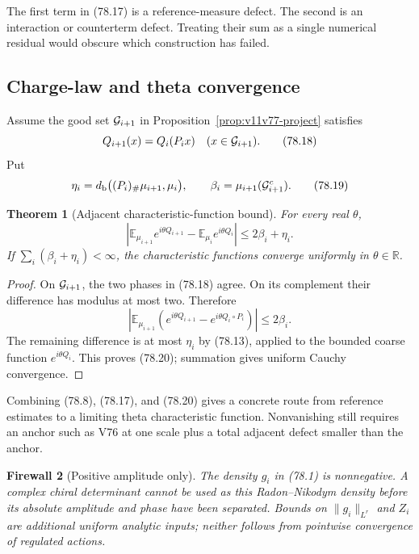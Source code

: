 \documentclass[11pt]{article}
\newtheorem{theorem}{Theorem}[section]
\newtheorem{firewall}[theorem]{Firewall}
\begin{document}
The first term in (78.17) is a reference-measure defect.  The second
is an interaction or counterterm defect.  Treating their sum as a
single numerical residual would obscure which construction has
failed.

\subsection{Charge-law and theta convergence}

Assume the good set \({\cal G}_{i+1}\) in
Proposition~\ref{prop:v11v77-project} satisfies
\[
              Q_{i+1}(x)=Q_i(P_ix)
                        \quad(x\in{\cal G}_{i+1}).            \tag{78.18}
\]
Put
\[
 \eta_i=d_{\rm b}\big((P_i)_\#\mu_{i+1},\mu_i\big),\qquad
 \beta_i=\mu_{i+1}({\cal G}_{i+1}^c).                         \tag{78.19}
\]

\begin{theorem}[Adjacent characteristic-function bound]
\label{thm:v11v78-characteristic}
For every real \(\theta\),
\[
 \left|
 \mathbb E_{\mu_{i+1}}e^{i\theta Q_{i+1}}
 -\mathbb E_{\mu_i}e^{i\theta Q_i}
 \right|
 \le 2\beta_i+\eta_i.                                        \tag{78.20}
\]
If \(\sum_i(\beta_i+\eta_i)<\infty\), the characteristic functions
converge uniformly in \(\theta\in\mathbb R\).
\end{theorem}

\begin{proof}
On \({\cal G}_{i+1}\), the two phases in (78.18) agree.  On its
complement their difference has modulus at most two.  Therefore
\[
 \left|
 \mathbb E_{\mu_{i+1}}
   \left(e^{i\theta Q_{i+1}}-e^{i\theta Q_i\circ P_i}\right)
 \right|\le2\beta_i.
\]
The remaining difference is at most \(\eta_i\) by (78.13), applied to
the bounded coarse function \(e^{i\theta Q_i}\).  This proves
(78.20); summation gives uniform Cauchy convergence.
\end{proof}

Combining (78.8), (78.17), and (78.20) gives a concrete route from
reference estimates to a limiting theta characteristic function.
Nonvanishing still requires an anchor such as V76 at one scale plus a
total adjacent defect smaller than the anchor.

\begin{firewall}[Positive amplitude only]
\label{fire:v11v78-boundary}
The density \(g_i\) in (78.1) is nonnegative.  A complex chiral
determinant cannot be used as this Radon--Nikodym density before its
absolute amplitude and phase have been separated.  Bounds on
\(\|g_i\|_{L^r}\) and \(Z_i\) are additional uniform analytic inputs;
neither follows from pointwise convergence of regulated actions.
\end{firewall}
\end{document}
